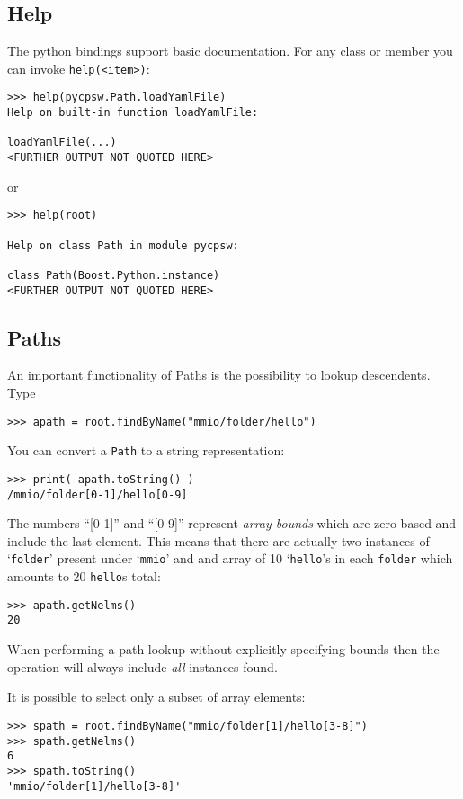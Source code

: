 \documentclass[10pt]{article}
\newcommand{\Paths}     {{Paths}}
\newcommand{\py}        {python}
\newcommand{\cod}[1] {{\tt#1}}
\begin{document}
\subsection{Help}
The \py{} bindings support basic documentation. For any class or member
you can invoke \cod{help(<item>)}:
\begin{verbatim}
>>> help(pycpsw.Path.loadYamlFile)
Help on built-in function loadYamlFile:

loadYamlFile(...)
<FURTHER OUTPUT NOT QUOTED HERE>
\end{verbatim}
or
\begin{verbatim}
>>> help(root)

Help on class Path in module pycpsw:

class Path(Boost.Python.instance)
<FURTHER OUTPUT NOT QUOTED HERE>
\end{verbatim}

\subsection{Paths}

An important functionality of \Paths{} is the possibility to lookup
descendents. Type

\begin{verbatim}
>>> apath = root.findByName("mmio/folder/hello")
\end{verbatim}

You can convert a \cod{Path} to a string representation:

\begin{verbatim}
>>> print( apath.toString() )
/mmio/folder[0-1]/hello[0-9]
\end{verbatim}

The numbers ``[0-1]'' and ``[0-9]'' represent {\em array bounds} which 
are zero-based and include the last element. This means that there are
actually two instances of `\cod{folder}' present under `\cod{mmio}' and
and array of 10 `\cod{hello}'s in each \cod{folder} which amounts to
20 \cod{hello}s total:

\begin{verbatim}
>>> apath.getNelms()
20
\end{verbatim}

When performing a path lookup without explicitly specifying bounds then
the operation will always include {\em all} instances found.

It is possible to select only a subset of array elements:

\begin{verbatim}
>>> spath = root.findByName("mmio/folder[1]/hello[3-8]")
>>> spath.getNelms()
6
>>> spath.toString()
'mmio/folder[1]/hello[3-8]'
\end{verbatim}
\end{document}

